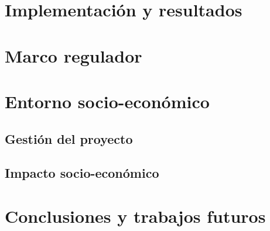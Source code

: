 \documentclass[12pt]{report} %
\begin{document}
\chapter{Implementación y resultados}



\chapter{Marco regulador}



\chapter{Entorno socio-económico}

\section{Gestión del proyecto}



\section{Impacto socio-económico}



\chapter{Conclusiones y trabajos futuros}




\clearpage
{}
\printbibliography




\end{document}
